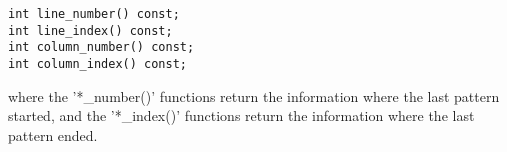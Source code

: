 \begin{description}
  \item [\tt int  line\_number() const;]
  \item [\tt int  line\_index() const;]
  \item [\tt int  column\_number() const;]
  \item [\tt int  column\_index() const;]
\end{description}

where the '*\_number()' functions return the information where the last
pattern started, and the '*\_index()' functions return the information where
the last pattern ended.



